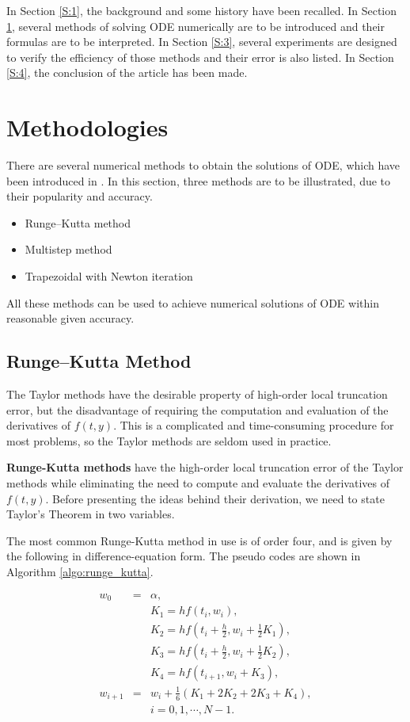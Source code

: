 \documentclass[preprint,12pt]{elsarticle}
\begin{document}
In Section \ref{S:1}, the background and some history  have been recalled. In Section \ref{S:2}, several methods of solving ODE numerically are to be introduced and their formulas are to be interpreted. In Section \ref{S:3}, several experiments are designed to verify the efficiency of those methods and their error is also listed. In Section \ref{S:4}, the conclusion of the article has been made.

\section{Methodologies}
\label{S:2}

There are several numerical methods to obtain the solutions of ODE, which have been introduced in \cite{burden:2001na}. In this section, three methods are to be illustrated, due to their popularity and accuracy.

\begin{itemize}
\item Runge–Kutta method
\item Multistep method
\item Trapezoidal with Newton iteration
\end{itemize}

All these methods can be used to achieve numerical solutions of ODE within reasonable given accuracy.

\subsection{Runge–Kutta Method}
\label{SS:2.1}

The Taylor methods have the desirable property of high-order local truncation error, but the disadvantage of requiring the computation and evaluation of the derivatives of $f(t,y)$. This is a complicated and time-consuming procedure for most problems, so the Taylor methods are seldom used in practice.

\textbf{Runge-Kutta methods} have the high-order local truncation error of the Taylor methods while eliminating the need to compute and evaluate the derivatives of $f(t,y)$. Before presenting the ideas behind their derivation, we need to state Taylor's Theorem in two variables.

The most common Runge-Kutta method in use is of order four, and is given by the following in difference-equation form. The pseudo codes are shown in Algorithm \ref{algo:runge_kutta}.

\begin{eqnarray*}
  w_0 &=& \alpha, \\
  &&K_1 = hf(t_i,w_i), \\
  &&K_2 = hf(t_i+\frac{h}{2},w_i+\frac{1}{2}K_1), \\
  &&K_3 = hf(t_i+\frac{h}{2},w_i+\frac{1}{2}K_2), \\
  &&K_4 = hf(t_{i+1},w_i+K_3),\\
  w_{i+1}&=& w_i+\frac{1}{6}(K_1+2K_2+2K_3+K_4),\\
  && i=0,1,\cdots,N-1.
\end{eqnarray*}
\end{document}
